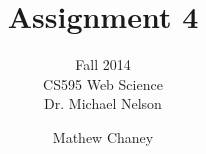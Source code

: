 \documentclass[10pt,letterpaper,bibliography=totocnumbered]{scrartcl}
\begin{document}
\author{Mathew Chaney}
\title{Assignment 4}
\subtitle{Fall 2014\\ CS595 Web Science\\ Dr. Michael Nelson}
\maketitle
\newpage

\tableofcontents
\listoffigures
\lstlistoflistings







\end{document}
